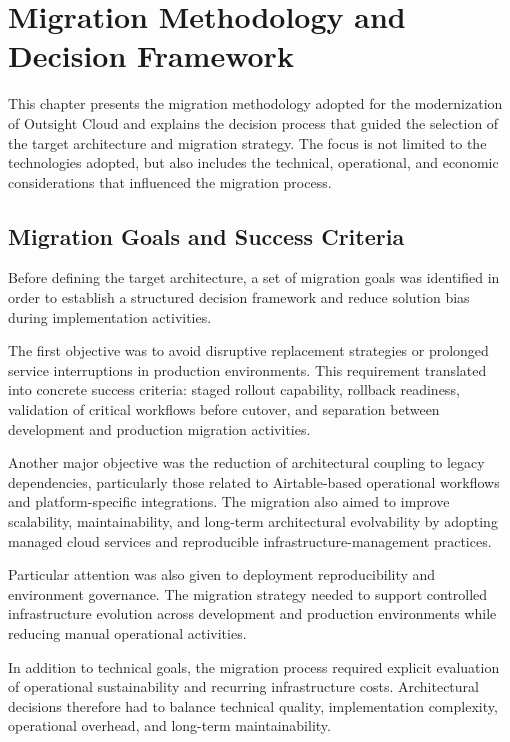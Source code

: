 \chapter{Migration Methodology and Decision Framework}
\label{chap:methodology}

This chapter presents the migration methodology adopted for the modernization of Outsight Cloud and explains the decision process that guided the selection of the target architecture and migration strategy. The focus is not limited to the technologies adopted, but also includes the technical, operational, and economic considerations that influenced the migration process.

\section{Migration Goals and Success Criteria}
Before defining the target architecture, a set of migration goals was identified in order to establish a structured decision framework and reduce solution bias during implementation activities.

The first objective was to avoid disruptive replacement strategies or prolonged service interruptions in production environments. This requirement translated into concrete success criteria: staged rollout capability, rollback readiness, validation of critical workflows before cutover, and separation between development and production migration activities.

Another major objective was the reduction of architectural coupling to legacy dependencies, particularly those related to Airtable-based operational workflows and platform-specific integrations. The migration also aimed to improve scalability, maintainability, and long-term architectural evolvability by adopting managed cloud services and reproducible infrastructure-management practices.

Particular attention was also given to deployment reproducibility and environment governance. The migration strategy needed to support controlled infrastructure evolution across development and production environments while reducing manual operational activities.

In addition to technical goals, the migration process required explicit evaluation of operational sustainability and recurring infrastructure costs. Architectural decisions therefore had to balance technical quality, implementation complexity, operational overhead, and long-term maintainability.

